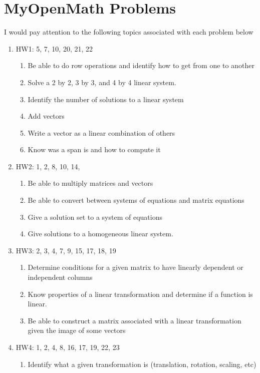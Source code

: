 \documentclass[12pt]{exam}
\begin{document}
\section{MyOpenMath Problems}
I would pay attention to the following topics associated with each problem below
\begin{enumerate}
    \item HW1: 5, 7, 10, 20, 21, 22
    \begin{enumerate}
        \item Be able to do row operations and identify how to get from one to another
        \item Solve a 2 by 2, 3 by 3, and 4 by 4 linear system.
        \item Identify the number of solutions to a linear system
        \item Add vectors
        \item Write a vector as a linear combination of others
        \item Know was a span is and how to compute it
    \end{enumerate}
    \item HW2: 1, 2, 8, 10, 14,
    \begin{enumerate}
        \item Be able to multiply matrices and vectors
        \item Be able to convert between systems of equations and matrix equations
        \item Give a solution set to a system of equations
        \item Give solutions to a homogeneous linear system.
    \end{enumerate}
    \item HW3: 2, 3, 4, 7, 9, 15, 17, 18, 19
    \begin{enumerate}
        \item Determine conditions for a given matrix to have linearly dependent or independent
            columns
        \item Know properties of a linear transformation and determine if a function
            is linear.
        \item Be able to construct a matrix associated with a linear transformation
            given the image of some vectors
    \end{enumerate}
    \item HW4: 1, 2, 4, 8, 16, 17, 19, 22, 23
    \begin{enumerate}
        \item Identify what a given transformation is (translation, rotation, scaling, etc)

\end{enumerate}
\end{enumerate}
\end{document}
